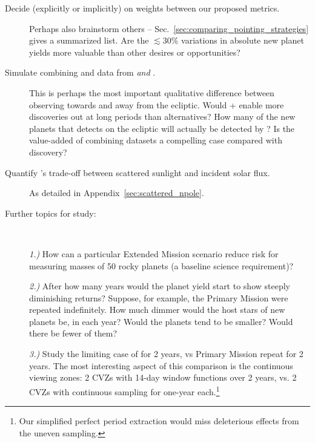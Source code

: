 \begin{description}
	\item[Decide (explicitly or implicitly) on weights between our
          proposed metrics.]  Perhaps also brainstorm others --
          Sec.~\ref{sec:comparing_pointing_strategies} gives a
          summarized list.  Are the $\lesssim30\%$ variations in
          absolute new planet yields more valuable than other desires
          or opportunities?
	
	\item[Simulate combining \tess and \ktwo data from
          \rm{\elong\:} \textit{and} \rm{\eshort}.]  This is perhaps
          the most important qualitative difference between observing
          towards and away from the ecliptic.  Would \tess\!+\ktwo
          enable more discoveries out at long periods than
          alternatives?  How many of the new planets that \tess
          detects on the ecliptic will actually be detected by \ktwo?
          Is the value-added of combining datasets a compelling case
          compared with discovery?
          
    \item[Quantify {\rm \npole}'s trade-off between scattered sunlight and 
    incident solar flux.]
    As detailed in Appendix~\ref{sec:scattered_npole}.
	
	\item[Further topics for study:]
	\ 
	
	\textit{1.)}
	How can a particular Extended Mission scenario reduce risk for measuring 
	masses of 50 rocky planets (a baseline \tess science requirement)?
	
	\textit{2.)}
	After how many years would the planet yield start to show steeply diminishing returns?
	Suppose, for example, the Primary Mission were repeated indefinitely.
  How much dimmer would the host stars of new planets be, in each year?
	Would the planets tend to be smaller?
	Would there be fewer of them?
	
	\textit{3.)}
	Study the limiting case of \hemis\:for 2 years, vs Primary Mission repeat 
	for 2 years. The most interesting aspect of this comparison is the 
	continuous viewing zones: 2 CVZs with 14-day window functions over 2 years, 
	vs. 2 CVZs with continuous sampling for one-year each.\footnote{Our 
	simplified perfect period extraction would miss deleterious effects from the 
	uneven sampling.}
\end{description}
